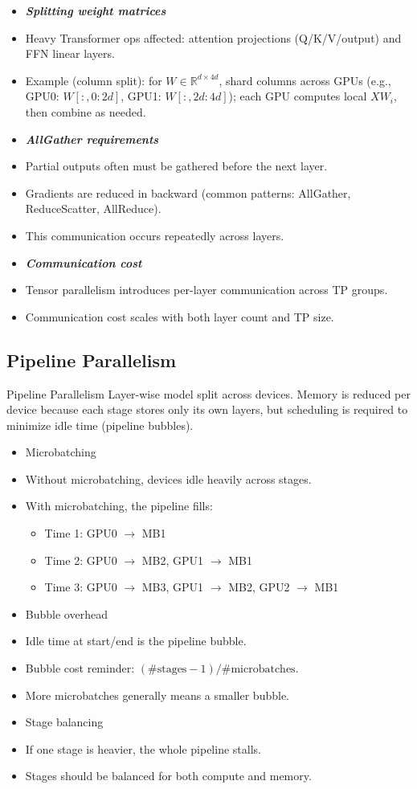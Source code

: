 \documentclass[12pt]{article}
\let\origtextbf\textbf
\renewcommand{\textbf}[1]{\origtextbf{\textit{#1}}}
\begin{document}
\begin{itemize}
\item \textbf{Splitting weight matrices}
\item Heavy Transformer ops affected: attention projections (Q/K/V/output) and FFN linear layers.
\item Example (column split): for \(W \in \mathbb{R}^{d \times 4d}\), shard columns across GPUs (e.g., GPU0: \(W[:,0:2d]\), GPU1: \(W[:,2d:4d]\)); each GPU computes local \(XW_i\), then combine as needed.
\item \textbf{AllGather requirements}
\item Partial outputs often must be gathered before the next layer.
\item Gradients are reduced in backward (common patterns: AllGather, ReduceScatter, AllReduce).
\item This communication occurs repeatedly across layers.
\item \textbf{Communication cost}
\item Tensor parallelism introduces per-layer communication across TP groups.
\item Communication cost scales with both layer count and TP size.
\end{itemize}

\subsection{Pipeline Parallelism}
\begin{bluebox}{Pipeline Parallelism}
Layer-wise model split across devices. Memory is reduced per device because each stage stores only its own layers, but scheduling is required to minimize idle time (pipeline bubbles).
\end{bluebox}

\begin{itemize}
\item Microbatching
\item Without microbatching, devices idle heavily across stages.
\item With microbatching, the pipeline fills:
\begin{itemize}
\item Time 1: GPU0 \(\rightarrow\) MB1
\item Time 2: GPU0 \(\rightarrow\) MB2, GPU1 \(\rightarrow\) MB1
\item Time 3: GPU0 \(\rightarrow\) MB3, GPU1 \(\rightarrow\) MB2, GPU2 \(\rightarrow\) MB1
\end{itemize}
\item Bubble overhead
\item Idle time at start/end is the pipeline bubble.
\item Bubble cost reminder: \((\#\text{stages} - 1)/\#\text{microbatches}\).
\item More microbatches generally means a smaller bubble.
\item Stage balancing
\item If one stage is heavier, the whole pipeline stalls.
\item Stages should be balanced for both compute and memory.
\end{itemize}
\end{document}

